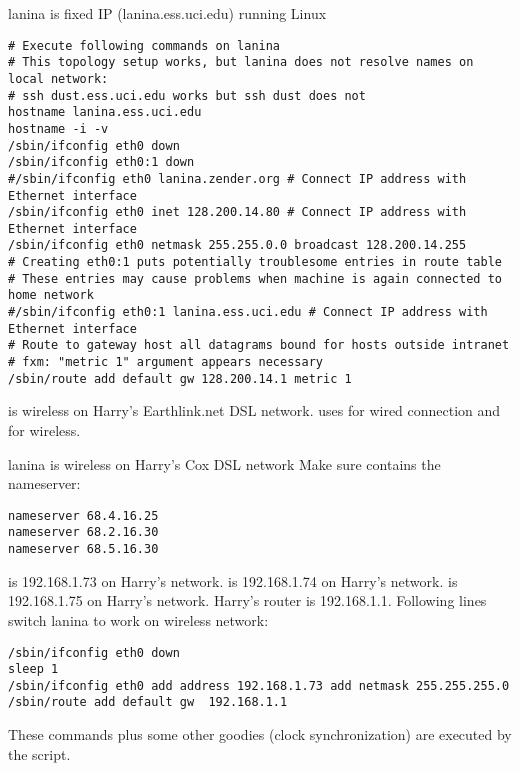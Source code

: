 \documentclass[12pt,twoside]{article}
\begin{document}
\begin{enumerate*}
\item lanina is fixed IP (lanina.ess.uci.edu) running Linux
\begin{verbatim}
# Execute following commands on lanina
# This topology setup works, but lanina does not resolve names on local network:
# ssh dust.ess.uci.edu works but ssh dust does not
hostname lanina.ess.uci.edu
hostname -i -v
/sbin/ifconfig eth0 down
/sbin/ifconfig eth0:1 down 
#/sbin/ifconfig eth0 lanina.zender.org # Connect IP address with Ethernet interface
/sbin/ifconfig eth0 inet 128.200.14.80 # Connect IP address with Ethernet interface
/sbin/ifconfig eth0 netmask 255.255.0.0 broadcast 128.200.14.255
# Creating eth0:1 puts potentially troublesome entries in route table
# These entries may cause problems when machine is again connected to home network
#/sbin/ifconfig eth0:1 lanina.ess.uci.edu # Connect IP address with Ethernet interface
# Route to gateway host all datagrams bound for hosts outside intranet
# fxm: "metric 1" argument appears necessary
/sbin/route add default gw 128.200.14.1 metric 1
\end{verbatim}

\item {} is wireless on Harry's Earthlink.net DSL network.
 uses  for wired connection and
 for wireless.

\item lanina is wireless on Harry's Cox DSL network
Make sure  contains the  nameserver: 
\begin{verbatim}
nameserver 68.4.16.25
nameserver 68.2.16.30
nameserver 68.5.16.30
\end{verbatim}
 is 192.168.1.73 on Harry's network.
 is 192.168.1.74 on Harry's network.
 is 192.168.1.75 on Harry's network.
Harry's router is 192.168.1.1.
Following lines switch lanina to work on wireless network:
\begin{verbatim}
/sbin/ifconfig eth0 down 
sleep 1
/sbin/ifconfig eth0 add address 192.168.1.73 add netmask 255.255.255.0 
/sbin/route add default gw  192.168.1.1 
\end{verbatim}
These commands plus some other goodies (clock synchronization) are
executed by the  script.
\end{enumerate*}
\end{document}
